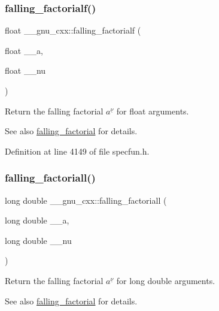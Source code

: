 \subsubsection{\texorpdfstring{falling\+\_\+factorialf()}{falling\_factorialf()}}
{\footnotesize\ttfamily float \+\_\+\+\_\+gnu\+\_\+cxx\+::falling\+\_\+factorialf (\begin{DoxyParamCaption}\item[{float}]{\+\_\+\+\_\+a,  }\item[{float}]{\+\_\+\+\_\+nu }\end{DoxyParamCaption})\hspace{0.3cm}{\ttfamily [inline]}}

Return the falling factorial $ a^{\underline{\nu}} $ for float arguments.

\begin{DoxySeeAlso}{See also}
\hyperlink{group__gnu__math__spec__func_ga3cc8eb6068c7155ec48b40e20160c5c0}{falling\+\_\+factorial} for details. 
\end{DoxySeeAlso}


Definition at line 4149 of file specfun.\+h.

\mbox{\label{group__gnu__math__spec__func_gab816c3bcbe00595881799ce969475085}} 
\subsubsection{\texorpdfstring{falling\+\_\+factoriall()}{falling\_factoriall()}}
{\footnotesize\ttfamily long double \+\_\+\+\_\+gnu\+\_\+cxx\+::falling\+\_\+factoriall (\begin{DoxyParamCaption}\item[{long double}]{\+\_\+\+\_\+a,  }\item[{long double}]{\+\_\+\+\_\+nu }\end{DoxyParamCaption})\hspace{0.3cm}{\ttfamily [inline]}}

Return the falling factorial $ a^{\underline{\nu}} $ for {\ttfamily  long double } arguments.

\begin{DoxySeeAlso}{See also}
\hyperlink{group__gnu__math__spec__func_ga3cc8eb6068c7155ec48b40e20160c5c0}{falling\+\_\+factorial} for details. 
\end{DoxySeeAlso}


